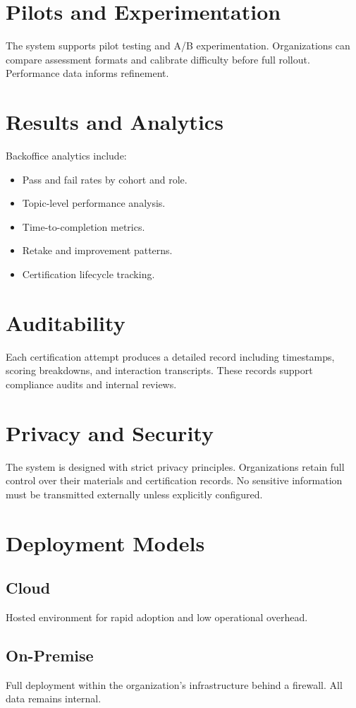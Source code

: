 \documentclass[11pt]{article}
\begin{document}
\section{Pilots and Experimentation}
The system supports pilot testing and A/B experimentation. Organizations can compare assessment formats and calibrate difficulty before full rollout. Performance data informs refinement.

\section{Results and Analytics}
Backoffice analytics include:
\begin{itemize}[noitemsep]
\item Pass and fail rates by cohort and role.
\item Topic-level performance analysis.
\item Time-to-completion metrics.
\item Retake and improvement patterns.
\item Certification lifecycle tracking.
\end{itemize}

\section{Auditability}
Each certification attempt produces a detailed record including timestamps, scoring breakdowns, and interaction transcripts. These records support compliance audits and internal reviews.

\section{Privacy and Security}
The system is designed with strict privacy principles. Organizations retain full control over their materials and certification records. No sensitive information must be transmitted externally unless explicitly configured.

\section{Deployment Models}
\subsection{Cloud}
Hosted environment for rapid adoption and low operational overhead.

\subsection{On-Premise}
Full deployment within the organization's infrastructure behind a firewall. All data remains internal.
\end{document}
